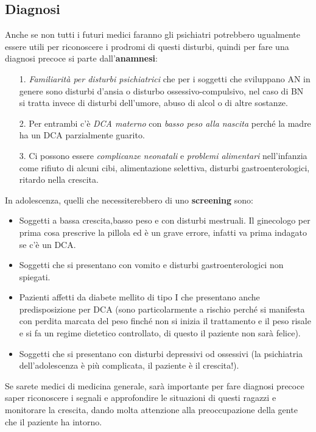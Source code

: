\subsection{Diagnosi}

Anche se non tutti i futuri medici faranno gli psichiatri potrebbero
ugualmente essere utili per riconoscere i prodromi di questi disturbi,
quindi per fare una diagnosi precoce si parte dall'\textbf{anamnesi}:

\begin{itemize}
\item[1.]
  \emph{Familiarità per disturbi psichiatrici} che per i soggetti che
  sviluppano AN in genere sono disturbi d'ansia o disturbo
  ossessivo-compulsivo, nel caso di BN si tratta invece di disturbi
  dell'umore, abuso di alcol o di altre sostanze.
\item[2.]
  Per entrambi c'è \emph{DCA materno} con \emph{basso peso alla nascita}
  perché la madre ha un DCA parzialmente guarito.
\item[3.]
  Ci possono essere \emph{complicanze neonatali} e \emph{problemi
  alimentari} nell'infanzia come rifiuto di alcuni cibi, alimentazione
  selettiva, disturbi gastroenterologici, ritardo nella crescita.
\end{itemize}

In adolescenza, quelli che necessiterebbero di uno \textbf{screening}
sono:

\begin{itemize}
\item
  Soggetti a bassa crescita,basso peso e con disturbi mestruali. Il
  ginecologo per prima cosa prescrive la pillola ed è un grave errore,
  infatti va prima indagato se c'è un DCA.
\item
  Soggetti che si presentano con vomito e disturbi gastroenterologici
  non spiegati.
\item
  Pazienti affetti da diabete mellito di tipo I che presentano anche
  predisposizione per DCA (sono particolarmente a rischio perché si
  manifesta con perdita marcata del peso finché non si inizia il
  trattamento e il peso risale e si fa un regime dietetico controllato,
  di questo il paziente non sarà felice).
\item
  Soggetti che si presentano con disturbi depressivi od ossessivi (la
  psichiatria dell'adolescenza è più complicata, il paziente è il
  crescita!).
\end{itemize}

Se sarete medici di medicina generale, sarà importante per fare diagnosi
precoce saper riconoscere i segnali e approfondire le situazioni di
questi ragazzi e monitorare la crescita, dando molta attenzione alla
preoccupazione della gente che il paziente ha intorno.

